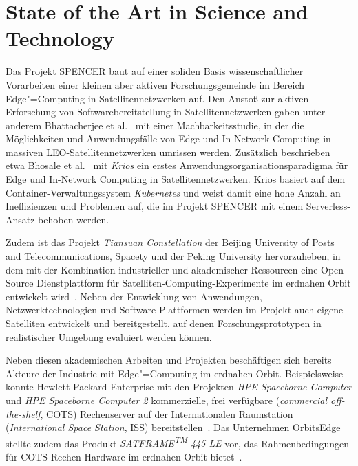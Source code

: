 \clearpage
\section{State of the Art in Science and Technology}
\label{sec:standWiss}


Das Projekt SPENCER baut auf einer soliden Basis wissenschaftlicher Vorarbeiten einer kleinen aber aktiven Forschungsgemeinde im Bereich Edge"=Computing in Satellitennetzwerken auf.
Den Anstoß zur aktiven Erforschung von Softwarebereitstellung in Satellitennetzwerken gaben unter anderem Bhattacherjee et al.~\cite{Bhattacherjee2020-kr} mit einer Machbarkeitsstudie, in der die Möglichkeiten und Anwendungsfälle von Edge und In-Network Computing in massiven LEO-Satellitennetzwerken umrissen werden.
Zusätzlich beschrieben etwa Bhosale et al.~\cite{Bhosale2020-aa} mit \emph{Krios} ein erstes Anwendungsorganisationsparadigma für Edge und In-Network Computing in Satellitennetzwerken.
Krios basiert auf dem Container-Verwaltungssystem \emph{Kubernetes} und weist damit eine hohe Anzahl an Ineffizienzen und Problemen auf, die im Projekt SPENCER mit einem Serverless-Ansatz behoben werden.

Zudem ist das Projekt \emph{Tiansuan Constellation} der Beijing University of Posts and Telecommunications, Spacety und der Peking University hervorzuheben, in dem mit der Kombination industrieller und akademischer Ressourcen eine Open-Source Dienstplattform für Satelliten-Computing-Experimente im erdnahen Orbit entwickelt wird~\cite{wang2021tiansuan,wang2022tiansuan2,tiansuan2023online}.
Neben der Entwicklung von Anwendungen, Netzwerktechnologien und Software-Plattformen werden im Projekt auch eigene Satelliten entwickelt und bereitgestellt, auf denen Forschungsprototypen in realistischer Umgebung evaluiert werden können.

Neben diesen akademischen Arbeiten und Projekten beschäftigen sich bereits Akteure der Industrie mit Edge"=Computing im erdnahen Orbit.
Beispielsweise konnte Hewlett Packard Enterprise mit den Projekten \emph{HPE Spaceborne Computer} und \emph{HPE Spaceborne Computer 2} kommerzielle, frei verfügbare (\emph{commercial off-the-shelf}, COTS) Rechenserver auf der Internationalen Raumstation (\emph{International Space Station}, ISS) bereitstellen~\cite{hpespaceborne}.
Das Unternehmen OrbitsEdge stellte zudem das Produkt \emph{SATFRAME\textsuperscript{TM} 445 LE} vor, das Rahmenbedingungen für COTS-Rechen-Hardware im erdnahen Orbit bietet~\cite{orbitsedge2022}.

